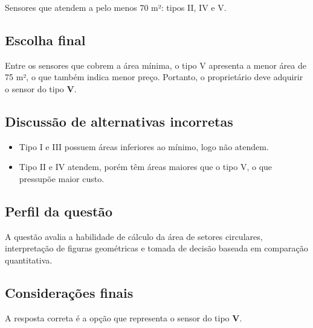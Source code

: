 \documentclass{article}
\begin{document}
Sensores que atendem a pelo menos 70 m²: tipos II, IV e V.

\subsection*{Escolha final}
Entre os sensores que cobrem a área mínima, o tipo V apresenta a menor área de 75 m², o que também indica menor preço. Portanto, o proprietário deve adquirir o sensor do tipo \textbf{V}.

\subsection*{Discussão de alternativas incorretas}
\begin{itemize}
\item Tipo I e III possuem áreas inferiores ao mínimo, logo não atendem.
\item Tipo II e IV atendem, porém têm áreas maiores que o tipo V, o que pressupõe maior custo.
\end{itemize}

\subsection*{Perfil da questão}
A questão avalia a habilidade de cálculo da área de setores circulares, interpretação de figuras geométricas e tomada de decisão baseada em comparação quantitativa.

\subsection*{Considerações finais}
A resposta correta é a opção que representa o sensor do tipo \textbf{V}.
\end{document}
